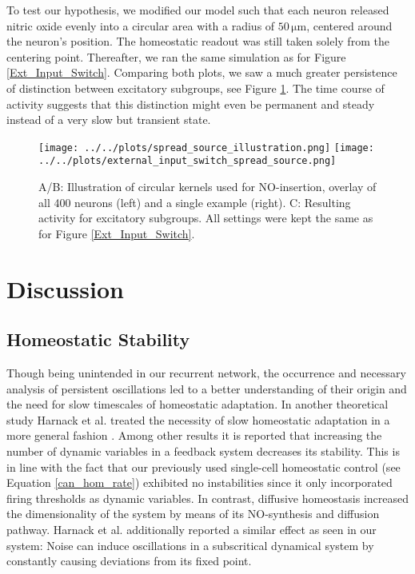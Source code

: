 \documentclass[10pt,a4paper]{article}
\begin{document}
To test our hypothesis, we modified our model such that each neuron released nitric oxide evenly into a circular area with a radius of $\mathrm{50 \, \mu m}$, centered around the neuron's position. The homeostatic readout was still taken solely from the centering point. Thereafter, we ran the same simulation as for Figure \ref{Ext_Input_Switch}. Comparing both plots, we saw a much greater persistence of distinction between excitatory subgroups, see Figure \ref{External_Input_Switch_Spread_Source}. The time course of activity suggests that this distinction might even be permanent and steady instead of a very slow but transient state.
\begin{figure}
\texttt{[image: ../../plots/spread\_source\_illustration.png]}
\texttt{[image: ../../plots/external\_input\_switch\_spread\_source.png]}
\caption{A/B: Illustration of circular kernels used for NO-insertion, overlay of all 400 neurons (left) and a single example (right). C: Resulting activity for excitatory subgroups. All settings were kept the same as for Figure \ref{Ext_Input_Switch}.}
\label{External_Input_Switch_Spread_Source}
\end{figure}


\section{Discussion}

\subsection{Homeostatic Stability}
Though being unintended in our recurrent network, the occurrence and necessary analysis of persistent oscillations led to a better understanding of their origin and the need for slow timescales of homeostatic adaptation. In another theoretical study Harnack et al. treated the necessity of slow homeostatic adaptation in a more general fashion \cite{Stability_Homeostasis_Harnack_2015}. Among other results it is reported that increasing the number of dynamic variables in a feedback system decreases its stability. This is in line with the fact that our previously used single-cell homeostatic control (see Equation \eqref{can_hom_rate}) exhibited no instabilities since it only incorporated firing thresholds as dynamic variables. In contrast, diffusive homeostasis increased the dimensionality of the system by means of its NO-synthesis and diffusion pathway. Harnack et al. additionally reported a similar effect as seen in our system: Noise can induce oscillations in a subscritical dynamical system by constantly causing deviations from its fixed point.
\end{document}
